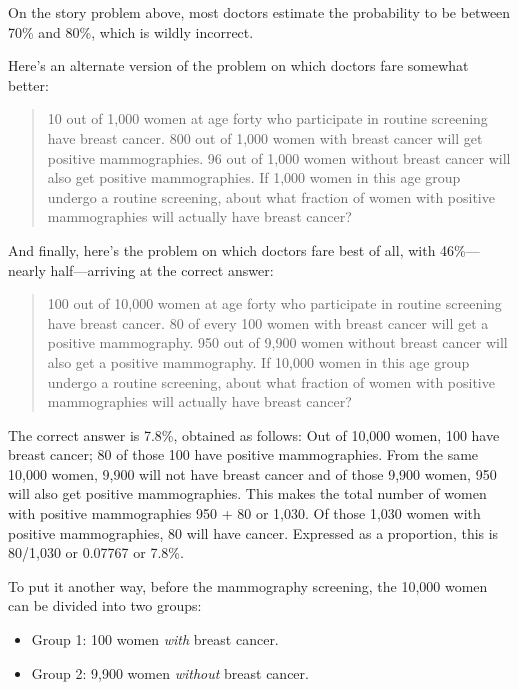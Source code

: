 {
 On the story problem above, most doctors estimate the probability
to be between 70\% and 80\%, which is wildly incorrect.}

{
 Here's an alternate version of the problem on
which doctors fare somewhat better:}

\begin{quote}
{
 10 out of 1,000 women at age forty who participate in routine
screening have breast cancer. 800 out of 1,000 women with breast cancer
will get positive mammographies. 96 out of 1,000 women without breast
cancer will also get positive mammographies. If 1,000 women in this age
group undergo a routine screening, about what fraction of women with
positive mammographies will actually have breast cancer?}
\end{quote}

{
 And finally, here's the problem on which doctors
fare best of all, with 46\%---nearly half---arriving at the correct
answer:}

\begin{quote}
{
 100 out of 10,000 women at age forty who participate in routine
screening have breast cancer. 80 of every 100 women with breast cancer
will get a positive mammography. 950 out of 9,900 women without breast
cancer will also get a positive mammography. If 10,000 women in this
age group undergo a routine screening, about what fraction of women
with positive mammographies will actually have breast cancer?}
\end{quote}

\hr

{
 The correct answer is 7.8\%, obtained as follows: Out of 10,000
women, 100 have breast cancer; 80 of those 100 have positive
mammographies. From the same 10,000 women, 9,900 will not have breast
cancer and of those 9,900 women, 950 will also get positive
mammographies. This makes the total number of women with positive
mammographies 950 + 80 or 1,030. Of those 1,030 women with positive
mammographies, 80 will have cancer. Expressed as a proportion, this is
80/1,030 or 0.07767 or 7.8\%.}

{
 To put it another way, before the mammography screening, the
10,000 women can be divided into two groups:}

\begin{itemize}
\item {
 Group 1: 100 women \textit{with} breast cancer.}

\item {
 Group 2: 9,900 women \textit{without} breast cancer.}
\end{itemize}

